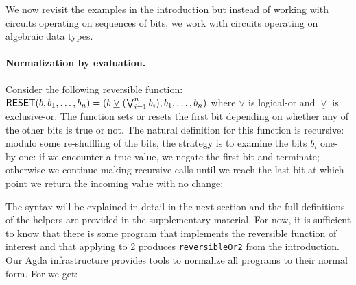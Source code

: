 

We now revisit the examples in the introduction but instead of working with circuits operating on sequences of bits, we
work with circuits operating on algebraic data types.

\paragraph*{Normalization by evaluation.} Consider the following reversible function:
$\Afun{RESET}(b,b_1,\ldots,b_n) = (b \; \underline{\vee} \; (\bigvee_{i=1}^n b_i),b_1,\ldots,b_n)$ where $\vee$ is
logical-or and $\underline{\vee}$ is exclusive-or. The function sets or resets the first bit depending on whether any of
the other bits is true or not. The natural definition for this function is recursive: modulo some re-shuffling of the
bits, the strategy is to examine the bits $b_i$ one-by-one: if we encounter a true value, we negate the first bit and
terminate; otherwise we continue making recursive calls until we reach the last bit at which point we return the
incoming value with no change:


\resettwo{}

\noindent The syntax will be explained in detail in the next section and the full definitions of the helpers are
provided in the supplementary material. For now, it is sufficient to know that there is some program that implements the
reversible function of interest and that applying  to 2 produces \verb|reversibleOr2| from the
introduction. Our Agda infrastructure provides tools to normalize all programs to their normal form. For 
we get:

\resetnormtwo{}

